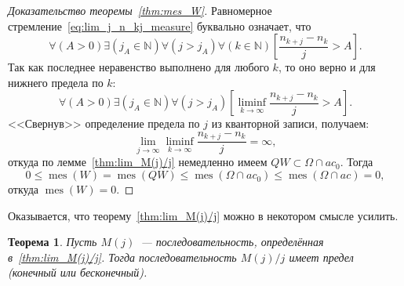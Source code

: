 \documentclass[a4paper,14pt]{article} %
\theoremstyle{plain}
\newtheorem{theorem}[lemma]{Теорема}
\begin{document}
\begin{proof}[Доказательство теоремы~\ref{thm:mes_W}]
	Равномерное стремление~\eqref{eq:lim_j_n_kj_measure}
	буквально означает, что
	\begin{equation}
		\forall(A>0)\exists(j_A\in\mathbb{N})\forall(j > j_A)\forall(k\in\mathbb{N})
		\left[
			\frac{n_{k+j}-n_k}{j}>A
		\right]
		.
	\end{equation}
	Так как последнее неравенство выполнено для любого $k$,
	то оно верно и для нижнего предела по $k$:
	\begin{equation}
		\forall(A>0)\exists(j_A\in\mathbb{N})\forall(j > j_A)
		\left[
			\liminf_{k\to\infty}\frac{n_{k+j}-n_k}{j}>A
		\right]
		.
	\end{equation}
	<<Свернув>> определение предела по $j$ из кванторной записи, получаем:
	\begin{equation}
		\lim_{j\to\infty}\liminf_{k\to\infty}\frac{n_{k+j}-n_k}{j} = \infty
		,
	\end{equation}
	откуда по лемме~\ref{thm:lim_M(j)/j} немедленно имеем $QW \subset \Omega\cap ac_0$.
	Тогда
	\begin{equation}
		0 \leq \operatorname{mes}(W) = \operatorname{mes}(QW) \leq \operatorname{mes}(\Omega\cap ac_0) \leq \operatorname{mes}(\Omega\cap ac) = 0
		,
	\end{equation}
	откуда $\operatorname{mes}(W)=0$.
\end{proof}

Оказывается, что теорему~\ref{thm:lim_M(j)/j} можно в некотором смысле усилить.

\begin{theorem}
	Пусть $M(j)$~--- последовательность, определённая в~\eqref{thm:lim_M(j)/j}.
	Тогда последовательность $M(j)/j$ имеет предел (конечный или бесконечный).
\end{theorem}
\end{document}
